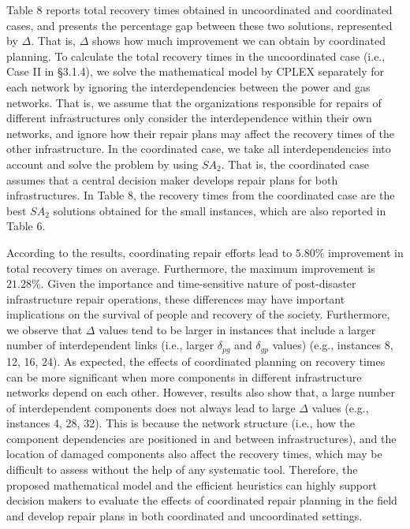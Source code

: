 \documentclass[11pt]{article}
\begin{document}
Table 8 reports total recovery times obtained in uncoordinated and coordinated cases, and presents the percentage gap between these two solutions, represented by $\Delta$. That is, $\Delta$ shows how much improvement we can obtain by coordinated planning. To calculate the total recovery times in the uncoordinated case (i.e., Case II in \S 3.1.4), we solve the mathematical model by CPLEX separately for each network by ignoring the interdependencies between the power and gas networks. That is, we assume that the organizations responsible for repairs of different infrastructures only consider the interdependence within their own networks, and ignore how their repair plans may affect the recovery times of the other infrastructure. In the coordinated case, we take all interdependencies into account and solve the problem by using $SA_2$. That is, the coordinated case assumes that a central decision maker develops repair plans for both infrastructures. In Table 8, the recovery times from the coordinated case are the best $SA_2$ solutions obtained for the small instances, which are also reported in Table 6. 


According to the results, coordinating repair efforts lead to $5.80\%$ improvement in total recovery times on average. Furthermore, the maximum improvement is $21.28\%$. Given the importance and time-sensitive nature of post-disaster infrastructure repair operations, these differences may have important implications on the survival of people and recovery of the society. Furthermore, we observe that $\Delta$ values tend to be larger in instances that include a larger number of interdependent links (i.e., larger $\delta_{pg}$ and $\delta_{gp}$ values) (e.g., instances 8, 12, 16, 24). As expected, the effects of coordinated planning on recovery times can be more significant when more components in different infrastructure networks depend on each other. However, results also show that, a large number of interdependent components does not always lead to large $\Delta$ values (e.g., instances 4, 28, 32). This is because the network structure (i.e., how the component dependencies are positioned in and between infrastructures), and the location of damaged components also affect the recovery times, which may be difficult to assess without the help of any systematic tool. Therefore, the proposed mathematical model and the efficient heuristics can highly support decision makers to evaluate the effects of coordinated repair planning in the field and develop repair plans in both coordinated and uncoordinated settings. 
\end{document}
